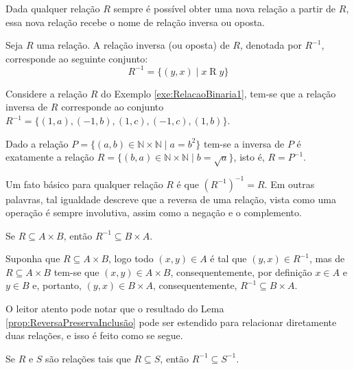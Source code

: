 Dada qualquer relação $R$ sempre é possível obter uma nova relação a partir de $R$, essa nova relação recebe o nome de relação inversa ou oposta.

\begin{definicao}\label{def:RelacaoInversa}
	Seja $R$ uma relação. A relação inversa (ou oposta) de $R$, denotada por $R^{-1}$, corresponde ao seguinte conjunto:
	$$R^{-1} = \{(y,x) \mid x\mathrel{R}y\}$$
\end{definicao}

\begin{exemplo}
  Considere a relação $R$ do Exemplo \ref{exe:RelacaoBinaria1}, tem-se que a relação inversa de $R$ corresponde ao conjunto $R^{-1} = \{(1, a), (-1, b), (1, c), (-1, c), (1, b)\}$.
\end{exemplo}

\begin{exemplo}
  Dado a relação $P = \{(a, b) \in \mathbb{N} \times \mathbb{N} \mid a = b^2\}$ tem-se a inversa de $P$ é exatamente a relação $R = \{(b, a) \in \mathbb{N} \times \mathbb{N} \mid b = \sqrt{a}\}$, isto é, $R = P^{-1}$.
\end{exemplo}

Um fato básico para qualquer relação $R$ é que $(R^{-1})^{-1} = R$. Em outras palavras, tal igualdade descreve que a reversa de uma relação, vista como uma operação é sempre involutiva, assim como a negação e o complemento.


\begin{lema}\label{prop:ReversaPreservaInclusão}
	Se $R \subseteq A \times B$, então $R^{-1} \subseteq B \times A$.
\end{lema}

\begin{prova}
	Suponha que $R \subseteq A \times B$, logo todo $(x, y) \in A$ é tal que $(y, x) \in R^{-1}$, mas de $R \subseteq A \times B$ tem-se que $(x, y) \in A \times B$, consequentemente, por definição $x \in A$ e $y \in B$ e, portanto, $(y, x) \in B \times A$, consequentemente, $R^{-1} \subseteq B \times A$.
\end{prova}

O leitor atento pode notar que o resultado do Lema \ref{prop:ReversaPreservaInclusão} pode ser estendido para relacionar diretamente duas relações, e isso é feito como se segue.

\begin{teorema}\label{teo:ReversaPreservaInclusão}
	Se $R$ e $S$ são relações tais que $R \subseteq S$, então $R^{-1} \subseteq S^{-1}$.
\end{teorema}

